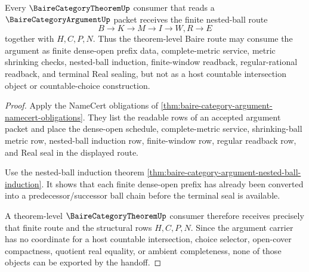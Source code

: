 \begin{theorem}
\label{thm:baire-category-argument-theorem-route-handoff}
Every $\BaireCategoryTheoremUp$ consumer that reads a $\BaireCategoryArgumentUp$ packet receives the finite nested-ball route
$$
B \longrightarrow K \longrightarrow M \longrightarrow I \longrightarrow W,R \longrightarrow E
$$
together with $H,C,P,N$. Thus the theorem-level Baire route may consume the argument as finite dense-open prefix data, complete-metric service, metric shrinking checks, nested-ball induction, finite-window readback, regular-rational readback, and terminal Real sealing, but not as a host countable intersection object or countable-choice construction.
\end{theorem}
\begin{proof}
Apply the NameCert obligations of \autoref{thm:baire-category-argument-namecert-obligations}. They list the readable rows of an accepted argument packet and place the dense-open schedule, complete-metric service, shrinking-ball metric row, nested-ball induction row, finite-window row, regular readback row, and Real seal in the displayed route.

Use the nested-ball induction theorem \autoref{thm:baire-category-argument-nested-ball-induction}. It shows that each finite dense-open prefix has already been converted into a predecessor/successor ball chain before the terminal seal is available.

A theorem-level $\BaireCategoryTheoremUp$ consumer therefore receives precisely that finite route and the structural rows $H,C,P,N$. Since the argument carrier has no coordinate for a host countable intersection, choice selector, open-cover compactness, quotient real equality, or ambient completeness, none of those objects can be exported by the handoff.
\end{proof}


